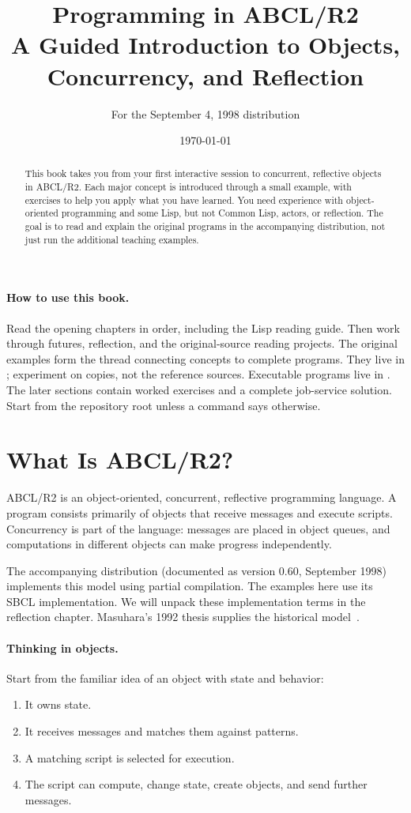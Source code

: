 \documentclass[11pt,a4paper]{article}
\title{Programming in ABCL/R2\\[0.5em]
  \large A Guided Introduction to Objects,\\
  Concurrency, and Reflection}
\author{For the September 4, 1998 distribution}
\date{\today}
\newcommand{\filepath}[1]{\path{#1}}
\begin{document}
\maketitle
\begin{abstract}
This book takes you from your first interactive session to concurrent,
reflective objects in ABCL/R2. Each major concept is introduced through a
small example, with exercises to help you apply what you have learned.
You need experience with object-oriented programming and some Lisp, but
not Common Lisp, actors, or reflection. The goal is to read and explain
the original programs in the accompanying distribution, not just run
the additional teaching examples.
\end{abstract}
\paragraph{How to use this book.}
Read the opening chapters in order, including the Lisp reading guide.
Then work through futures, reflection, and the original-source reading projects.
The original examples form the thread connecting concepts to complete programs.
They live in \filepath{examples/}; experiment on copies, not the reference sources.
Executable programs live in \filepath{tutorial/examples/}.
The later sections contain worked exercises and a complete job-service solution.
Start from the repository root unless a command says otherwise.
\begingroup
\linespread{0.90}
\small
\setlength{\parskip}{0pt}
\tableofcontents
\endgroup
\newpage

\section{What Is ABCL/R2?}

ABCL/R2 is an object-oriented, concurrent, reflective programming language.
A program consists primarily of objects that receive messages and execute
scripts. Concurrency is part of the language: messages are placed in object
queues, and computations in different objects can make progress independently.

The accompanying distribution
(documented as version 0.60, September 1998) implements this model using
partial compilation. The examples here use its SBCL implementation.
We will unpack these implementation terms in the reflection chapter.
Masuhara's 1992 thesis supplies the historical model~\cite{masuhara}.

\paragraph{Thinking in objects.}
Start from the familiar idea of an object with state and behavior:
\begin{enumerate}[nosep]
  \item It owns state.
  \item It receives messages and matches them against patterns.
  \item A matching script is selected for execution.
  \item The script can compute, change state, create objects, and send
        further messages.
\end{enumerate}
\end{document}
